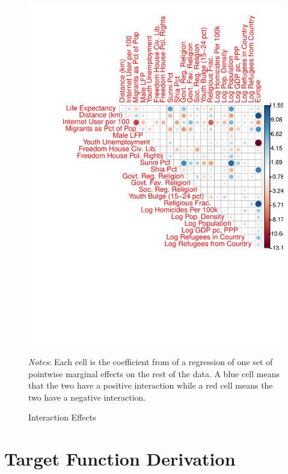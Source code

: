 \documentclass[12pt]{article}
\begin{document}
\begin{figure}[!h]
	\centering
	\includegraphics[scale=.85]{tabs_figs/interactPlot.pdf}
	\caption{Interaction Effects}	\label{fig:interactplot}
	\begin{flushleft} \footnotesize \textit{Notes}: Each cell is the coefficient from of a regression of one set of pointwise marginal effects on the rest of the data. A blue cell means that the two have a positive interaction while a red cell means the two have a negative interaction.	\end{flushleft}
\end{figure}

\section{Target Function Derivation}	\label{app:deriv}
\end{document}
